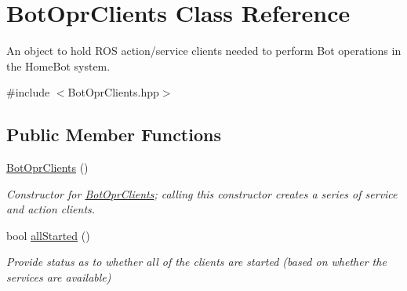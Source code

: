 \hypertarget{classBotOprClients}{\section{Bot\-Opr\-Clients Class Reference}
\label{classBotOprClients}
}


An object to hold R\-O\-S action/service clients needed to perform Bot operations in the Home\-Bot system.  




{\ttfamily \#include $<$Bot\-Opr\-Clients.\-hpp$>$}

\subsection*{Public Member Functions}
\begin{DoxyCompactItemize}
\item 
\hypertarget{classBotOprClients_a536678010c6da735d24be3c3f3c08591}{\hyperlink{classBotOprClients_a536678010c6da735d24be3c3f3c08591}{Bot\-Opr\-Clients} ()}\label{classBotOprClients_a536678010c6da735d24be3c3f3c08591}

\begin{DoxyCompactList}\small\item\em Constructor for \hyperlink{classBotOprClients}{Bot\-Opr\-Clients}; calling this constructor creates a series of service and action clients. \end{DoxyCompactList}\item 
bool \hyperlink{classBotOprClients_a391df41704d4984c1c757c4e095a5fe7}{all\-Started} ()
\begin{DoxyCompactList}\small\item\em Provide status as to whether all of the clients are started (based on whether the services are available) \end{DoxyCompactList}\end{DoxyCompactItemize}

